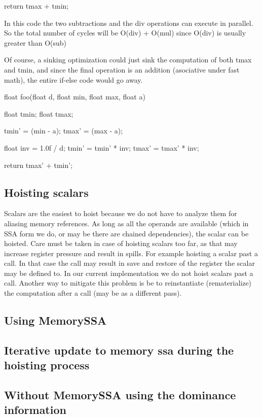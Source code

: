\begin{section}
\begin{program}
{  return tmax + tmin;
}

\end{program}

In this code the two subtractions and the div operations can execute
in parallel. So the total number of cycles will be O(div) + O(mul)
since O(div) is usually greater than O(sub)

Of course, a sinking optimization could just sink the computation of
both tmax and tmin, and since the final operation is an addition
(asociative under fast math), the entire if-else code would go away.

\begin{program}
float foo(float d, float min, float max, float a)
{
  float tmin;
  float tmax;

  tmin' = (min - a);
  tmax' = (max - a);

  float inv = 1.0f / d;
  tmin' = tmin' * inv;
  tmax' = tmax' * inv;

  return tmax' + tmin';
}
\end{program}

\section{Hoisting scalars}
Scalars are the easiest to hoist because we do not have to analyze
them for aliasing memory references. As long as all the operands are
available (which in SSA form we do, or may be there are chained
dependencies), the scalar can be hoisted. Care must be taken in case
of hoisting scalars too far, as that may increase register pressure
and result in spills. For example hoisting a scalar past a call. In
that case the call may result in save and restore of the register the
scalar may be defined to. In our current implementation we do not
hoist scalars past a call. Another way to mitigate this problem is be
to reinstantiate (rematerialize) the computation after a call (may be
as a different pass).



\section{Using MemorySSA}
\subsection{Iterative update to memory ssa during the hoisting process}

\section{Without MemorySSA using the dominance information}


\end{section}
